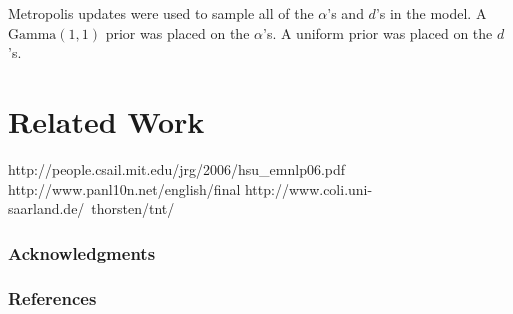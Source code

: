\documentclass{article}
\newcommand{\comment}[1]{}
\begin{document}
Metropolis updates were used to sample all of the $\alpha$'s and $d$'s in the model.  A $\mbox{Gamma}(1,1)$ prior was placed on the $\alpha$'s.  A uniform prior was placed on the $d$'s.  

\comment{It is in this representation that intuitions about the behaviour of the switch variables' effect on the domain adaptation performance of the DHPYLM are most readily developed.  For example, mentioning , we found that in the top level restaurants corresponding to the distributions over words given no context the model learns to set the switch variables to switch out of the context and into the latent context approximately thirty percent of the time and less for greater depths.  This could be because of}




\section{}

\section{Related Work}

http://people.csail.mit.edu/jrg/2006/hsu\_emnlp06.pdf
http://www.panl10n.net/english/final%
http://www.coli.uni-saarland.de/~thorsten/tnt/

\subsubsection*{Acknowledgments}

\subsubsection*{References}
\begin{small}

 
%
\end{small}
\end{document}
